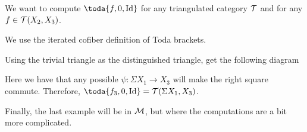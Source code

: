 \begin{example}
	We want to compute \( \toda{f, 0, \Id} \) for any triangulated category \( {\mathcal{T}} \) and for any \( f \in {\mathcal{T}}(X_2, X_3) \).

	We use the iterated cofiber definition of Toda brackets.

	Using the trivial triangle as the distinguished triangle, get the following diagram
	\begin{center}
	\end{center}

	Here we have that any possible \( \psi: \Sigma X_1 \to X_3 \) will make the right square commute. Therefore, \( \toda{f_3, 0, \Id} = \Tc(\Sigma X_1, X_3) \).
\end{example}

Finally, the last example will be in \( {\mathcal{M}} \), but where the computations are a bit more complicated.

